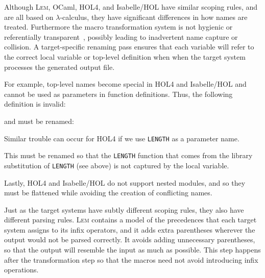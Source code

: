 \documentclass[a4paper]{llncs}
\newcommand{\myparagraph}[1]{\vspace{0.5\baselineskip}\par\noindent{\normalsize\bfseries{#1}}\quad}
\newcommand{\Lem}{\textsc{Lem}}
\begin{document}
\myparagraph{Renaming}
Although \Lem{}, OCaml, HOL4, and Isabelle/HOL have similar scoping rules,
and are all based on $\lambda$-calculus, they have significant differences in
how names are treated.  Furthermore the macro transformation system is not
hygienic or referentially transparent~\cite{ref-trans-macro,hygienic-macro},
possibly leading to inadvertent name capture or collision.  A target-specific
renaming pass ensures that each variable will refer to the correct local
variable or top-level definition when when the target system processes the
generated output file.

For example, top-level names become special in HOL4 and Isabelle/HOL and cannot
be used as parameters in function definitions.  Thus, the following definition
is invalid:

{
\par{}
}
\noindent
and must be renamed:

{
\par{}}

\noindent Similar trouble can occur for HOL4 if we use \texttt{LENGTH} as a parameter
name.

{
\par{}}

\noindent
This must be renamed so that the \texttt{LENGTH} function that comes from the
library substitution of \texttt{LENGTH} (see above) is not captured by the local
variable.

{
\par{}
}
\noindent Lastly, HOL4 and Isabelle/HOL do not support nested modules, and so they must be
flattened while avoiding the creation of conflicting names.

\myparagraph{Parenthesis insertion}
Just as the target systems have subtly different scoping rules, they also have
different parsing rules.  \Lem{} contains a model of the precedences that
each target system assigns to its infix operators, and it adds extra parentheses
wherever the output would not be parsed correctly.  It avoids adding unnecessary
parentheses, so that the output will resemble the input as much as possible.
This step happens after the transformation step so that the macros need not
avoid introducing infix operations.
\end{document}
